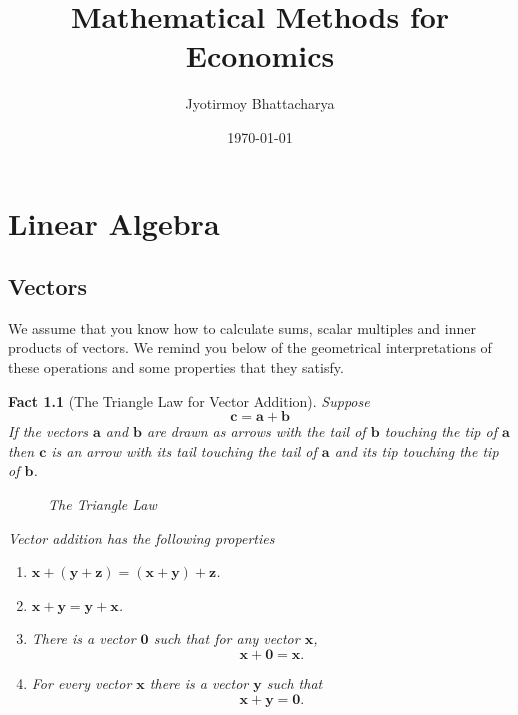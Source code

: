 \documentclass[11pt,reqno,openany]{amsbook}
\title{Mathematical Methods for Economics}
\author{Jyotirmoy Bhattacharya}
\date{\today}
\numberwithin{figure}{chapter}
\numberwithin{equation}{chapter}
\theoremstyle{plain}
\newtheorem{fact}{Fact}[chapter]
\theoremstyle{definition}
\renewcommand{\vec}[1]{\mathbf{#1}}
\begin{document}
\frontmatter
\maketitle
\tableofcontents
\mainmatter
\chapter{Linear Algebra}
\section{Vectors}
We assume that you know how to calculate sums, scalar multiples and
inner products of vectors. We remind you below of the geometrical
interpretations of these operations and some properties that they
satisfy.

\begin{fact}[The Triangle Law for Vector Addition]
  Suppose
  \[\vec{c}=\vec{a}+\vec{b}\]
  If the vectors $\vec{a}$ and $\vec{b}$ are drawn as arrows with the
  tail of $\vec{b}$ touching the tip of $\vec{a}$ then $\vec{c}$ is an
  arrow with its tail touching the tail of $\vec{a}$ and its tip
  touching the tip of $\vec{b}$.
  
  \begin{figure}[h]
  \caption{The Triangle Law}
  \end{figure}

  Vector addition has the following properties
  \begin{enumerate}
  \item $\vec{x}+(\vec{y}+\vec{z})=(\vec{x}+\vec{y})+\vec{z}$.
  \item $\vec{x}+\vec{y}=\vec{y}+\vec{x}$.
  \item There is a vector $\vec{0}$ such that for any vector
    $\vec{x}$,
    \[\vec{x}+\vec{0}=\vec{x}.\]
  \item For every vector $\vec{x}$ there is a vector $\vec{y}$ such
    that
    \[\vec{x}+\vec{y}=\vec{0}.\]
  \end{enumerate}
\end{fact}
\end{document}

